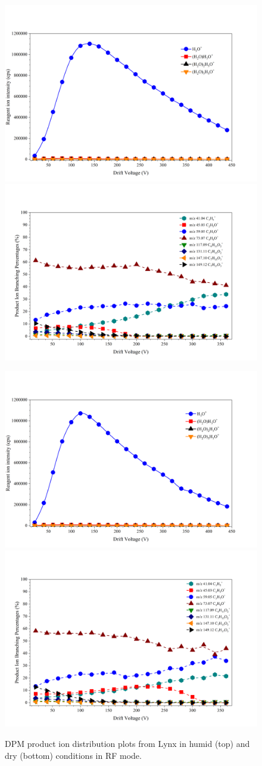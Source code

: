 \begin{figure}%
\centering
\includegraphics[width=0.48\linewidth]{pics/DPM_clusters_humid_RF.png}
\includegraphics[width=0.48\linewidth]{pics/DPM_humid_RF.png}

\includegraphics[width=0.48\linewidth]{pics/DPM_clusters_dry_RF.png}
\includegraphics[width=0.48\linewidth]{pics/DPM_dry_RF.png}
\caption{DPM product ion distribution plots from Lynx in humid (top) and  dry (bottom) conditions in RF mode.}
\label{fig:dpm2}
\end{figure}






